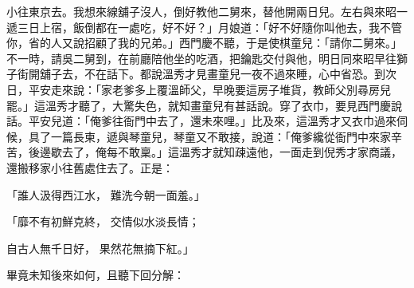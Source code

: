 小往東京去。我想來線舖子沒人，倒好教他二舅來，替他開兩日兒。左右與來昭一遞三日上宿，飯倒都在一處吃，好不好？」月娘道：「好不好隨你叫他去，我不管你，省的人又說招顧了我的兄弟。」西門慶不聽，于是使棋童兒：「請你二舅來。」不一時，請吳二舅到，在前廳陪他坐的吃酒，把鑰匙交付與他，明日同來昭早往獅子街開舖子去，不在話下。都說溫秀才見畫童兒一夜不過來睡，心中省恐。到次日，平安走來說：「家老爹多上覆溫師父，早晚要這房子堆貨，教師父別尋房兒罷。」這溫秀才聽了，大驚失色，就知畫童兒有甚話說。穿了衣巾，要見西門慶說話。平安兒道：「俺爹往衙門中去了，還未來哩。」比及來，這溫秀才又衣巾過來伺候，具了一篇長柬，遞與琴童兒，琴童又不敢接，說道：「俺爹纔從衙門中來家辛苦，後邊歇去了，俺每不敢稟。」這溫秀才就知疎遠他，一面走到倪秀才家商議，還搬移家小往舊處住去了。正是：

「誰人汲得西江水，  難洗今朝一面羞。」

「靡不有初鮮克終，  交情似水淡長情；

自古人無千日好，  果然花無摘下紅。」

畢竟未知後來如何，且聽下回分解：

